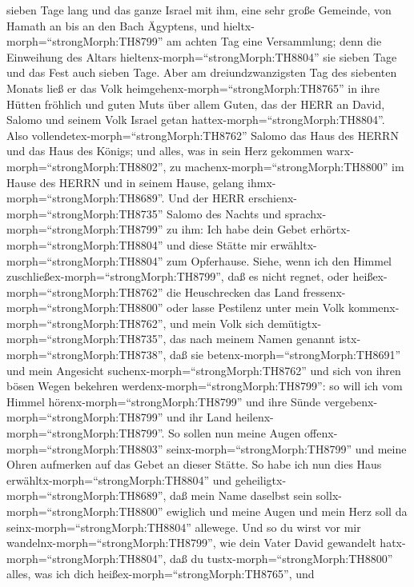 sieben Tage lang und das ganze Israel mit ihm, eine sehr große Gemeinde,
von Hamath an bis an den Bach Ägyptens,  und
hieltx-morph=``strongMorph:TH8799'' am achten Tag eine Versammlung; denn
die Einweihung des Altars hieltenx-morph=``strongMorph:TH8804'' sie
sieben Tage und das Fest auch sieben Tage.  Aber am
dreiundzwanzigsten Tag des siebenten Monats ließ er das Volk
heimgehenx-morph=``strongMorph:TH8765'' in ihre Hütten fröhlich und
guten Muts über allem Guten, das der HERR an David, Salomo und seinem
Volk Israel getan hattex-morph=``strongMorph:TH8804''. 
Also vollendetex-morph=``strongMorph:TH8762'' Salomo das Haus des HERRN
und das Haus des Königs; und alles, was in sein Herz gekommen
warx-morph=``strongMorph:TH8802'', zu
machenx-morph=``strongMorph:TH8800'' im Hause des HERRN und in seinem
Hause, gelang ihmx-morph=``strongMorph:TH8689''.  Und der
HERR erschienx-morph=``strongMorph:TH8735'' Salomo des Nachts und
sprachx-morph=``strongMorph:TH8799'' zu ihm: Ich habe dein Gebet
erhörtx-morph=``strongMorph:TH8804'' und diese Stätte mir
erwähltx-morph=``strongMorph:TH8804'' zum Opferhause. 
Siehe, wenn ich den Himmel zuschließex-morph=``strongMorph:TH8799'', daß
es nicht regnet, oder heißex-morph=``strongMorph:TH8762'' die
Heuschrecken das Land fressenx-morph=``strongMorph:TH8800'' oder lasse
Pestilenz unter mein Volk kommenx-morph=``strongMorph:TH8762'',
 und mein Volk sich demütigtx-morph=``strongMorph:TH8735'',
das nach meinem Namen genannt istx-morph=``strongMorph:TH8738'', daß sie
betenx-morph=``strongMorph:TH8691'' und mein Angesicht
suchenx-morph=``strongMorph:TH8762'' und sich von ihren bösen Wegen
bekehren werdenx-morph=``strongMorph:TH8799'': so will ich vom Himmel
hörenx-morph=``strongMorph:TH8799'' und ihre Sünde
vergebenx-morph=``strongMorph:TH8799'' und ihr Land
heilenx-morph=``strongMorph:TH8799''.  So sollen nun meine
Augen offenx-morph=``strongMorph:TH8803''
seinx-morph=``strongMorph:TH8799'' und meine Ohren aufmerken auf das
Gebet an dieser Stätte.  So habe ich nun dies Haus
erwähltx-morph=``strongMorph:TH8804'' und
geheiligtx-morph=``strongMorph:TH8689'', daß mein Name daselbst sein
sollx-morph=``strongMorph:TH8800'' ewiglich und meine Augen und mein
Herz soll da seinx-morph=``strongMorph:TH8804'' allewege. 
Und so du wirst vor mir wandelnx-morph=``strongMorph:TH8799'', wie dein
Vater David gewandelt hatx-morph=``strongMorph:TH8804'', daß du
tustx-morph=``strongMorph:TH8800'' alles, was ich dich
heißex-morph=``strongMorph:TH8765'', und
